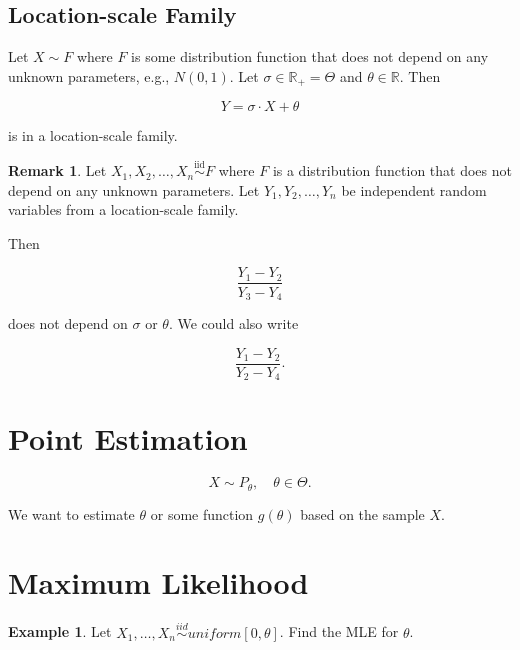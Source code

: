 \documentclass[12pt]{article}
\theoremstyle{definition}
\newtheorem*{example}{Example}
\newtheorem*{remark}{Remark}
\begin{document}
\subsection{Location-scale Family}

Let $X \sim F$ where $F$ is some distribution function that does not depend
on any unknown parameters, e.g., $N(0,1)$. Let $\sigma \in \mathbb{R}_{+} = \Theta$ and
$\theta \in \mathbb{R}$. Then

$$ Y = \sigma \cdot X + \theta $$

is in a location-scale family.

\begin{remark}
Let $X_1, X_2, \ldots, X_n \overset{\text{iid}}{\sim} F$ where $F$ is
a distribution function that does not depend on any unknown parameters.
Let $Y_1, Y_2, \ldots, Y_n$ be independent random variables from a 
location-scale family.

Then

\begin{equation*}
\frac{Y_1 - Y_2}{Y_3 - Y_4}
\end{equation*}

does not depend on $\sigma$ or $\theta$. We could also write

\begin{equation*}
\frac{Y_1 - Y_2}{Y_2 - Y_4}.
\end{equation*}

\end{remark}





\section{Point Estimation}

\begin{equation*}
X \sim P_{\theta}, \quad \theta \in \Theta.
\end{equation*}

We want to estimate $\theta$ or some function $g(\theta)$ based on the
sample $X$.



\section{Maximum Likelihood}

\begin{example}
Let $X_1, \ldots, X_n \overset{iid}{\sim} uniform[0,\theta]$. Find the MLE for $\theta$.
\end{example}
\end{document}
